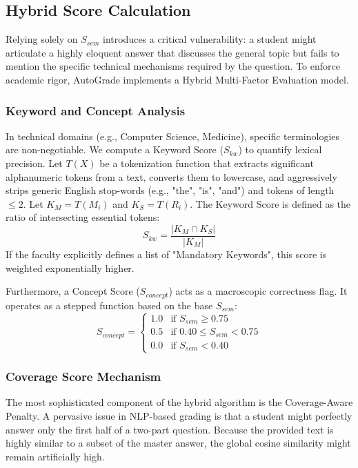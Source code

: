 \documentclass[conference]{IEEEtran}
\begin{document}
\subsection{Hybrid Score Calculation}
Relying solely on $S_{sem}$ introduces a critical vulnerability: a student might articulate a highly eloquent answer that discusses the general topic but fails to mention the specific technical mechanisms required by the question. To enforce academic rigor, AutoGrade implements a Hybrid Multi-Factor Evaluation model.

\subsubsection{Keyword and Concept Analysis}
In technical domains (e.g., Computer Science, Medicine), specific terminologies are non-negotiable. We compute a Keyword Score ($S_{kw}$) to quantify lexical precision. Let $T(X)$ be a tokenization function that extracts significant alphanumeric tokens from a text, converts them to lowercase, and aggressively strips generic English stop-words (e.g., "the", "is", "and") and tokens of length $\leq 2$.
Let $K_M = T(M_i)$ and $K_S = T(R_i)$. The Keyword Score is defined as the ratio of intersecting essential tokens:
\begin{equation}
S_{kw} = \frac{|K_M \cap K_S|}{|K_M|}
\end{equation}
If the faculty explicitly defines a list of "Mandatory Keywords", this score is weighted exponentially higher. 

Furthermore, a Concept Score ($S_{concept}$) acts as a macroscopic correctness flag. It operates as a stepped function based on the base $S_{sem}$:
\begin{equation}
S_{concept} = 
\begin{cases} 
1.0 & \text{if } S_{sem} \geq 0.75 \\
0.5 & \text{if } 0.40 \leq S_{sem} < 0.75 \\
0.0 & \text{if } S_{sem} < 0.40
\end{cases}
\end{equation}

\subsubsection{Coverage Score Mechanism}
The most sophisticated component of the hybrid algorithm is the Coverage-Aware Penalty. A pervasive issue in NLP-based grading is that a student might perfectly answer only the first half of a two-part question. Because the provided text is highly similar to a subset of the master answer, the global cosine similarity might remain artificially high.
\end{document}
